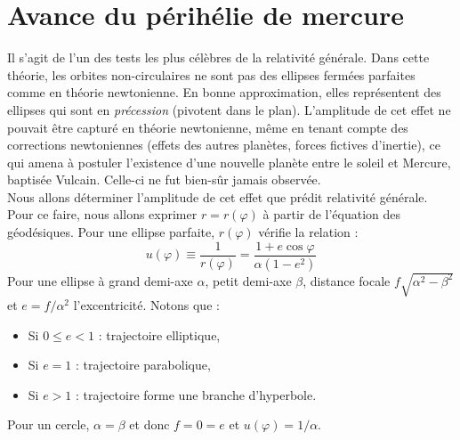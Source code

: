 \section{Avance du périhélie de mercure}
Il s'agit de l'un des tests les plus célèbres de la relativité générale. Dans cette théorie, les orbites non-circulaires ne sont pas des ellipses fermées parfaites comme en théorie newtonienne. En bonne approximation, elles représentent des ellipses qui sont en \emph{précession} (pivotent dans le plan). L'amplitude de cet effet ne pouvait être capturé en théorie newtonienne, même en tenant compte des corrections newtoniennes (effets des autres planètes, forces fictives d'inertie), ce qui amena à postuler l'existence d'une nouvelle planète entre le soleil et Mercure, baptisée Vulcain. Celle-ci ne fut bien-sûr jamais observée.\\
Nous allons déterminer l'amplitude de cet effet que prédit relativité générale. Pour ce faire, nous allons exprimer $r = r(\varphi)$ à partir de l'équation des géodésiques. Pour une ellipse parfaite, $r(\varphi)$ vérifie la relation :
\begin{equation}
    \label{équation ellipse parfaite}
    u(\varphi) \equiv \frac{1}{r(\varphi)} = \frac{1 + e\cos \varphi}{\alpha (1 - e^2)}
\end{equation}
Pour une ellipse à grand demi-axe $\alpha$, petit demi-axe $\beta$, distance focale $f \sqrt{\alpha^2-\beta^2}$ et $e = f/\alpha^2$ l'excentricité. Notons que :
\begin{itemize}
    \item Si $0\leq e< 1$ : trajectoire elliptique,
    \item Si $e=1$ : trajectoire parabolique,
    \item Si $e>1$ : trajectoire forme une branche d'hyperbole.
\end{itemize}
Pour un cercle, $\alpha = \beta$ et donc $f = 0 = e$ et $u(\varphi) = 1/\alpha$.
